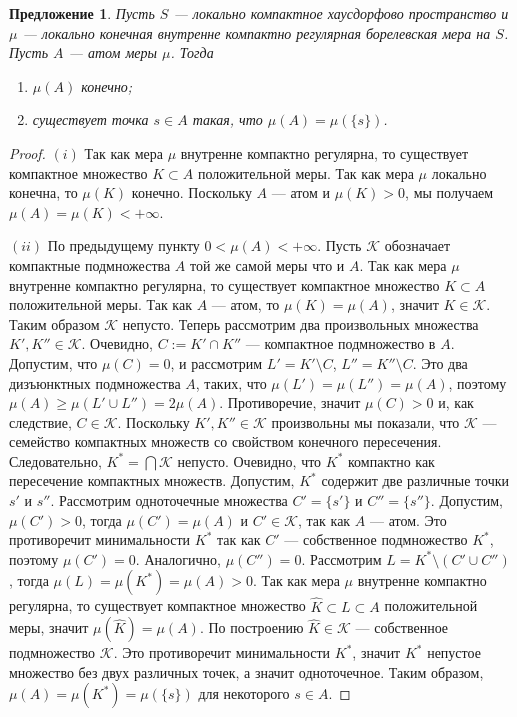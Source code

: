\documentclass[12pt]{article}
\newtheorem{proposition}[theorem]{Предложение}
\begin{document}
\begin{proposition}\label{MeasAtomCharac} Пусть $S$ --- локально компактное
    хаусдорфово пространство и $\mu$ --- локально конечная внутренне компактно
    регулярная борелевская мера на $S$. Пусть $A$ --- атом меры $\mu$. Тогда
    \begin{enumerate}[label = (\roman*)]
        \item $\mu(A)$ конечно;
        \item существует точка $s\in A$ такая, что $\mu(A)=\mu(\{s\})$.
    \end{enumerate}
\end{proposition}
\begin{proof} $(i)$ Так как мера $\mu$ внутренне компактно регулярна, то
    существует компактное множество $K\subset A$ положительной меры. Так как
    мера $\mu$ локально конечна, то $\mu(K)$ конечно. Поскольку $A$ --- атом и
    $\mu(K)>0$, мы получаем $\mu(A)=\mu(K)<+\infty$.

    $(ii)$ По предыдущему пункту $0<\mu(A)<+\infty$. Пусть $\mathcal{K}$
    обозначает компактные подмножества $A$ той же самой меры что и $A$. Так как
    мера $\mu$ внутренне компактно регулярна, то существует компактное множество
    $K\subset A$ положительной меры. Так как $A$ --- атом, то $\mu(K)=\mu(A)$,
    значит $K\in\mathcal{K}$. Таким образом $\mathcal{K}$ непусто. Теперь
    рассмотрим два произвольных множества $K',K''\in\mathcal{K}$. Очевидно,
    $C:=K'\cap K''$ --- компактное подмножество в $A$. Допустим, что $\mu(C)=0$,
    и рассмотрим $L'=K'\setminus C$, $L''=K''\setminus C$. Это два дизъюнктных
    подмножества $A$, таких, что $\mu(L')=\mu(L'')=\mu(A)$, поэтому $\mu(A)\geq
        \mu(L'\cup L'')=2\mu(A)$. Противоречие, значит $\mu(C)>0$ и, как следствие,
    $C\in\mathcal{K}$. Поскольку $K', K''\in \mathcal{K}$ произвольны мы
    показали, что $\mathcal{K}$ --- семейство компактных множеств со свойством
    конечного пересечения. Следовательно, $K^*=\bigcap\mathcal{K}$ непусто.
    Очевидно, что $K^*$ компактно как пересечение компактных множеств. Допустим,
    $K^*$ содержит две различные точки $s'$ и $s''$. Рассмотрим одноточечные
    множества $C'=\{s'\}$ и $C''=\{s''\}$. Допустим, $\mu(C')>0$, тогда
    $\mu(C')=\mu(A)$ и $C'\in\mathcal{K}$, так как $A$ --- атом. Это
    противоречит минимальности $K^*$ так как $C'$ --- собственное подмножество
    $K^*$, поэтому $\mu(C')=0$. Аналогично, $\mu(C'')=0$. Рассмотрим
    $L=K^*\setminus (C'\cup C'')$, тогда $\mu(L)=\mu(K^*)=\mu(A)>0$. Так как
    мера $\mu$ внутренне компактно регулярна, то существует компактное множество
    $\hat{K}\subset L\subset A$ положительной меры, значит
    $\mu(\hat{K})=\mu(A)$. По построению $\hat{K}\in\mathcal{K}$ --- собственное
    подмножество $\mathcal{K}$. Это противоречит минимальности $K^*$, значит
    $K^*$ непустое множество без двух различных точек, а значит одноточечное.
    Таким образом, $\mu(A)=\mu(K^*)=\mu(\{s\})$ для некоторого $s\in A$.
\end{proof}
\end{document}
